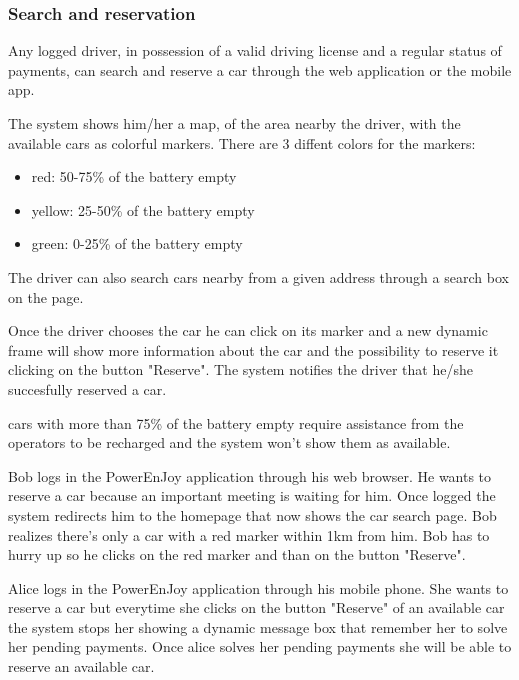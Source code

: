 \subsubsection{Search and reservation}

Any logged driver, in possession of a valid driving license and a regular status of payments, can search and reserve a car through the web application or the mobile app.

The system shows him/her a map, of the area nearby the driver, with the available cars as colorful markers. There are 3 diffent colors for the markers:
\begin{itemize}
	\item red: 50-75\% of the battery empty
	\item yellow: 25-50\% of the battery empty
	\item green: 0-25\% of the battery empty
\end{itemize}
The driver can also search cars nearby from a given address through a search box on the page.

Once the driver chooses the car he can click on its marker and a new dynamic frame will show more information about the car and the possibility to reserve it clicking on the button "Reserve".
The system notifies the driver that he/she succesfully reserved a car.

cars with more than 75\% of the battery empty require assistance from the operators to be recharged and the system won't show them as available. 


Bob logs in the PowerEnJoy application through his web browser. He wants to reserve a car because an important meeting is waiting for him. Once logged the system redirects him to the homepage that now shows the car search page. Bob realizes there's only a car with a red marker within 1km from him. Bob has to hurry up so he clicks on the red marker and than on the button "Reserve".

Alice logs in the PowerEnJoy application through his mobile phone. She wants to reserve a car but everytime she clicks on the button "Reserve" of an available car the system stops her showing a dynamic message box that remember her to solve her pending payments. Once alice solves her pending payments she will be able to reserve an available car.


